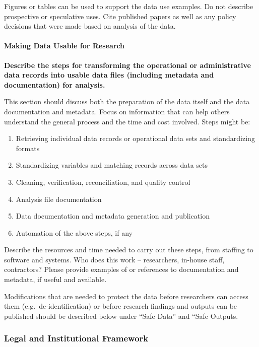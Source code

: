 \documentclass[
]{WileySix}
\providecommand{\tightlist}{%
  \setlength{\itemsep}{0pt}\setlength{\parskip}{0pt}}
\begin{document}
Figures or tables can be used to support the data use examples. Do not describe prospective or speculative uses. Cite published papers as well as any policy decisions that were made based on analysis of the data.

\hypertarget{making-data-usable-for-research-7}{%
\paragraph{Making Data Usable for Research}\label{making-data-usable-for-research-7}}

\textbf{Describe the steps for transforming the operational or administrative data records into usable data files (including metadata and documentation) for analysis.}

This section should discuss both the preparation of the data itself and the data documentation and metadata. Focus on information that can help others understand the general process and the time and cost involved. Steps might be:

\begin{enumerate}
\def\labelenumi{\arabic{enumi}.}
\tightlist
\item
  Retrieving individual data records or operational data sets and standardizing formats
\item
  Standardizing variables and matching records across data sets
\item
  Cleaning, verification, reconciliation, and quality control
\item
  Analysis file documentation
\item
  Data documentation and metadata generation and publication
\item
  Automation of the above steps, if any
\end{enumerate}

Describe the resources and time needed to carry out these steps, from staffing to software and systems. Who does this work -- researchers, in-house staff, contractors? Please provide examples of or references to documentation and metadata, if useful and available.

Modifications that are needed to protect the data before researchers can access them (e.g.~de-identification) or before research findings and outputs can be published should be described below under ``Safe Data'' and ``Safe Outputs.

\hypertarget{legal-and-institutional-framework-8}{%
\subsubsection*{Legal and Institutional Framework}\label{legal-and-institutional-framework-8}}
\end{document}
